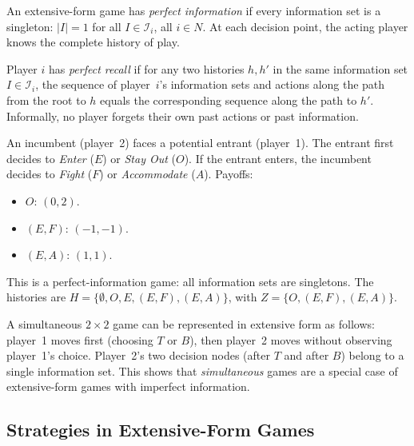 \documentclass[11pt,a4paper]{article}
\begin{document}
\begin{definition}
\label{def:perfect_info}
An extensive-form game has \emph{perfect information} if every information
set is a singleton: $|I| = 1$ for all $I \in \mathcal{I}_i$, all $i \in N$.
At each decision point, the acting player knows the complete history of play.
\end{definition}

\begin{definition}
\label{def:perfect_recall}
Player $i$ has \emph{perfect recall} if for any two histories $h, h'$ in the
same information set $I \in \mathcal{I}_i$, the sequence of player~$i$'s
information sets and actions along the path from the root to $h$ equals the
corresponding sequence along the path to $h'$. Informally, no player forgets
their own past actions or past information.
\end{definition}

\begin{example}
\label{ex:entry}
An incumbent (player~2) faces a potential entrant (player~1). The entrant
first decides to \emph{Enter} ($E$) or \emph{Stay Out} ($O$). If the
entrant enters, the incumbent decides to \emph{Fight} ($F$) or
\emph{Accommodate} ($A$). Payoffs:
\begin{itemize}[nosep]
    \item $O$: $(0, 2)$.
    \item $(E, F)$: $(-1, -1)$.
    \item $(E, A)$: $(1, 1)$.
\end{itemize}
This is a perfect-information game: all information sets are singletons.
The histories are $H = \{\emptyset, O, E, (E,F), (E,A)\}$, with
$Z = \{O, (E,F), (E,A)\}$.
\end{example}

\begin{example}
\label{ex:simultaneous}
A simultaneous $2 \times 2$ game can be represented in extensive form as
follows: player~1 moves first (choosing $T$ or $B$), then player~2 moves
without observing player~1's choice. Player~2's two decision nodes
(after $T$ and after $B$) belong to a single information set. This shows
that \emph{simultaneous} games are a special case of extensive-form games
with imperfect information.
\end{example}

\subsection{Strategies in Extensive-Form Games}
\label{subsec:strategies}
\end{document}
